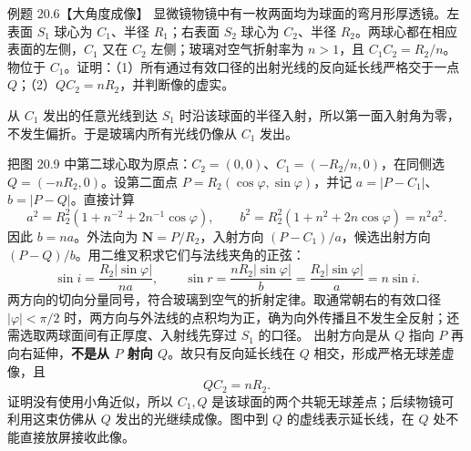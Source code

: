 \begin{origexamplebox}{例题 20.6【大角度成像】}
显微镜物镜中有一枚两面均为球面的弯月形厚透镜。左表面 $S_1$ 球心为 $C_1$、半径 $R_1$；右表面 $S_2$ 球心为 $C_2$、半径 $R_2$。两球心都在相应表面的左侧，$C_1$ 又在 $C_2$ 左侧；玻璃对空气折射率为 $n>1$，且 $C_1C_2=R_2/n$。物位于 $C_1$。证明：（1）所有通过有效口径的出射光线的反向延长线严格交于一点 $Q$；（2）$QC_2=nR_2$，并判断像的虚实。
\end{origexamplebox}
\begin{xesolution}
从 $C_1$ 发出的任意光线到达 $S_1$ 时沿该球面的半径入射，所以第一面入射角为零，不发生偏折。于是玻璃内所有光线仍像从 $C_1$ 发出。

把图 20.9 中第二球心取为原点：$C_2=(0,0)$、$C_1=(-R_2/n,0)$，在同侧选 $Q=(-nR_2,0)$。设第二面点 $P=R_2(\cos\varphi,\sin\varphi)$，并记 $a=|P-C_1|$、$b=|P-Q|$。直接计算
\[
 a^2=R_2^2(1+n^{-2}+2n^{-1}\cos\varphi),\qquad
 b^2=R_2^2(1+n^2+2n\cos\varphi)=n^2a^2.
\]
因此 $b=na$。外法向为 $\boldsymbol N=P/R_2$，入射方向 $(P-C_1)/a$，候选出射方向 $(P-Q)/b$。用二维叉积求它们与法线夹角的正弦：
\[
 \sin i=\frac{R_2|\sin\varphi|}{na},\qquad
 \sin r=\frac{nR_2|\sin\varphi|}{b}
 =\frac{R_2|\sin\varphi|}{a}=n\sin i.
\]
两方向的切向分量同号，符合玻璃到空气的折射定律。取通常朝右的有效口径 $|\varphi|<\pi/2$ 时，两方向与外法线的点积均为正，确为向外传播且不发生全反射；还需选取两球面间有正厚度、入射线先穿过 $S_1$ 的口径。
出射方向是从 $Q$ 指向 $P$ 再向右延伸，\textbf{不是从 $P$ 射向 $Q$}。故只有反向延长线在 $Q$ 相交，形成严格无球差虚像，且
\[
 \boxed{QC_2=nR_2}.
\]
证明没有使用小角近似，所以 $C_1,Q$ 是该球面的两个共轭无球差点；后续物镜可利用这束仿佛从 $Q$ 发出的光继续成像。图中到 $Q$ 的虚线表示延长线，在 $Q$ 处不能直接放屏接收此像。
\end{xesolution}

